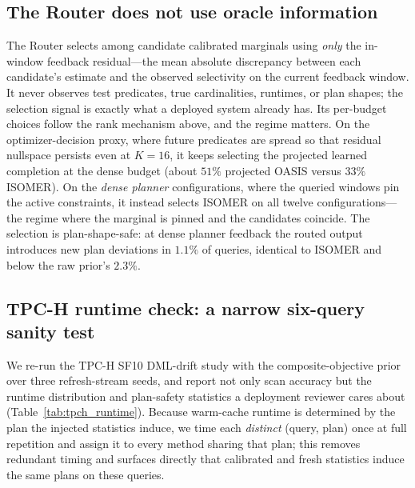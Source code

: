 \subsection{The Router does not use oracle information}
\label{sec:mr-router}

The Router selects among candidate calibrated marginals using \emph{only} the
in-window feedback residual---the mean absolute discrepancy between each
candidate's estimate and the observed selectivity on the current feedback
window. It never observes test predicates, true cardinalities, runtimes, or plan
shapes; the selection signal is exactly what a deployed system already has. Its
per-budget choices follow the rank mechanism above, and the regime matters. On the
optimizer-decision proxy, where future predicates are spread so that residual nullspace
persists even at $K{=}16$, it keeps selecting the projected learned completion at the
dense budget (about $51\%$ projected OASIS versus $33\%$ ISOMER). On the \emph{dense
planner} configurations, where the queried windows pin the active constraints, it instead
selects ISOMER on all twelve configurations---the regime where the marginal is pinned and
the candidates coincide.
The selection is plan-shape-safe: at dense planner feedback the routed output
introduces new plan deviations in $1.1\%$ of queries, identical to ISOMER and
below the raw prior's $2.3\%$.

\subsection{TPC-H runtime check: a narrow six-query sanity test}
\label{sec:mr-tpch}

We re-run the TPC-H SF10 DML-drift study with the composite-objective prior over
three refresh-stream seeds, and report not only scan accuracy but the runtime
distribution and plan-safety statistics a deployment reviewer cares about
(Table~\ref{tab:tpch_runtime}). Because warm-cache runtime is determined by the
plan the injected statistics induce, we time each \emph{distinct} (query, plan)
once at full repetition and assign it to every method sharing that plan; this
removes redundant timing and surfaces directly that calibrated and fresh
statistics induce the same plans on these queries.

